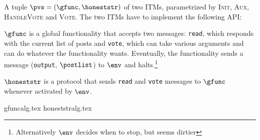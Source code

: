 \begin{definition}
  A tuple $\pvs = \left(\gfunc, \honeststr\right)$ of two ITMs, parametrized
  by \textsc{Init}, \textsc{Aux}, \textsc{HandleVote} and \textsc{Vote}. The
  two ITMs have to implement the following API:

  $\gfunc$ is a global functionality that accepts two messages:
  \texttt{read}, which responds with the current list of posts and
  \texttt{vote}, which can take various arguments and can do whatever the
  functionality wants. Eventually, the functionality sends a message
  (\texttt{output}, $\postlist$) to $\env$ and halts.\footnote{Alternatively
  $\env$ decides when to stop, but seems dirtier}

  $\honeststr$ is a protocol that sends \texttt{read} and \texttt{vote}
  messages to $\gfunc$ whenever activated by $\env$.
\end{definition}
{gfuncalg.tex}
{honeststralg.tex}
